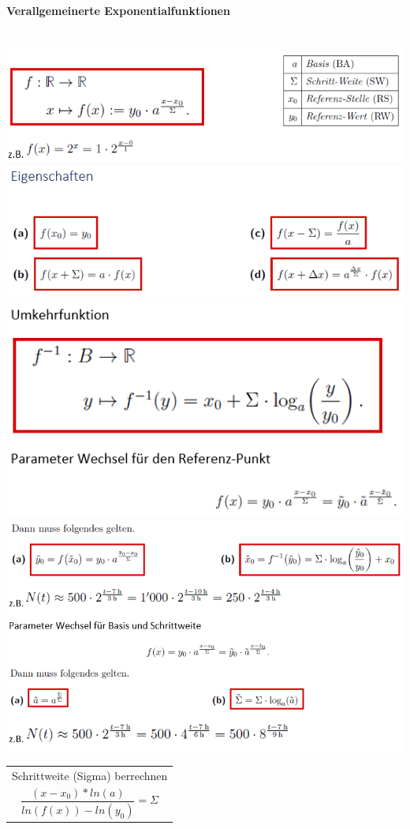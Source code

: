 \paragraph{Verallgemeinerte Exponentialfunktionen}\mbox{}\\
\noindent
\includegraphics[width=\columnwidth]{./images/expo.png}
\includegraphics[width=\columnwidth]{./images/expo1.png}
\includegraphics[width=\columnwidth]{./images/expo2.png}
\includegraphics[width=\columnwidth]{./images/expo3.png}
\begin{tabularx}{\columnwidth}{@{}X@{}}
    \hline
    Schrittweite (Sigma) berrechnen \\
    \[ \frac{(x-x_0)*ln(a)}{ln(f(x))-ln(y_0)} = \Sigma \] \\ \hline
\end{tabularx}
\vspace{1mm}

